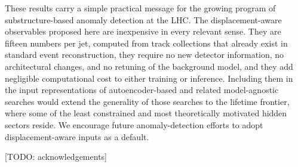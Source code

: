 \documentclass[a4paper,11pt]{article}
\newcommand{\todo}[1]{{\color{red!70!black}[TODO: #1]}}
\begin{document}
These results carry a simple practical message for the growing program
of substructure-based anomaly detection at the LHC. The
displacement-aware observables proposed here are inexpensive in every
relevant sense. They are fifteen numbers per jet, computed from track
collections that already exist in standard event reconstruction, they
require no new detector information, no architectural changes, and no
retuning of the background model, and they add negligible
computational cost to either training or inference. Including them in
the input representations of autoencoder-based and related
model-agnostic searches would extend the generality of those searches
to the lifetime frontier, where some of the least constrained and most
theoretically motivated hidden sectors reside. We encourage future
anomaly-detection efforts to adopt displacement-aware inputs as a
default.

\acknowledgments

\todo{acknowledgements}
\end{document}
